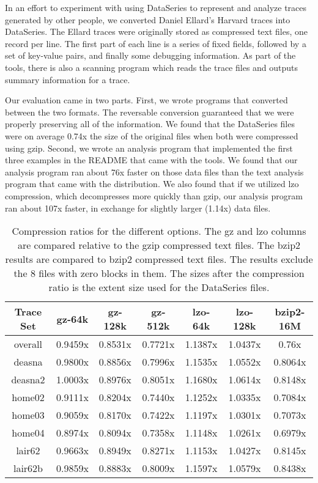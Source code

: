 \documentclass{acm_proc_article-sp}
\begin{document}
In an effort to experiment with using DataSeries to represent and
analyze traces generated by other people, we converted Daniel Ellard's
Harvard traces\cite{ellard03} into DataSeries.  The Ellard traces
were originally stored as compressed text files, one record per line.
The first part of each line is a series of fixed fields, followed by a
set of key-value pairs, and finally some debugging information.  As
part of the tools, there is also a scanning program which reads the
trace files and outputs summary information for a trace.

Our evaluation came in two parts.  First, we wrote programs that
converted between the two formats.  The reversable conversion
guaranteed that we were properly preserving all of the information.
We found that the DataSeries files were on average 0.74x the size of
the original files when both were compressed using gzip.  Second, we
wrote an analysis program that implemented the first three examples in
the README that came with the tools.  We found that our analysis
program ran about 76x faster on those data files than the text
analysis program that came with the distribution.  
We also found that if we utilized lzo compression, which decompresses
more quickly than gzip,
our analysis program
ran about 107x faster, in exchange for slightly larger (1.14x) data files.

\begin{table*}[t]
\centering
\begin{tabular}{|c|c|c|c|c|c|c|}\hline
Trace Set & gz-64k  & gz-128k & gz-512k & lzo-64k & lzo-128k & bzip2-16M \\ \hline
overall   & 0.9459x & 0.8531x & 0.7721x & 1.1387x & 1.0437x & 0.76x   \\
deasna    & 0.9800x & 0.8856x & 0.7996x & 1.1535x & 1.0552x & 0.8064x \\
deasna2   & 1.0003x & 0.8976x & 0.8051x & 1.1680x & 1.0614x & 0.8148x \\
home02    & 0.9111x & 0.8204x & 0.7440x & 1.1252x & 1.0335x & 0.7084x \\
home03    & 0.9059x & 0.8170x & 0.7422x & 1.1197x & 1.0301x & 0.7073x \\
home04    & 0.8974x & 0.8094x & 0.7358x & 1.1148x & 1.0261x & 0.6979x \\
lair62    & 0.9663x & 0.8949x & 0.8271x & 1.1153x & 1.0427x & 0.8145x \\
lair62b   & 0.9859x & 0.8883x & 0.8009x & 1.1597x & 1.0579x & 0.8438x \\
\hline
\end{tabular}

\caption{Compression ratios for the different options.  The gz and lzo
columns are compared relative to the gzip compressed text files.  The
bzip2 results are compared to bzip2 compressed text files.  The
results exclude the 8 files with zero blocks in them.  The sizes after
the compression ratio is the extent size used for the DataSeries files.}

\label{table:ellard:compression}
\end{table*}
\end{document}
